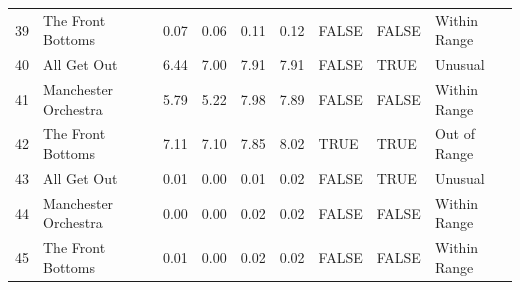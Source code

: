 \documentclass{article}\usepackage[]{graphicx}\usepackage[]{xcolor}
\begin{document}
\begin{table}[H]
\begin{tabular}{rlrrrrlll}
  39 & The Front Bottoms & 0.07 & 0.06 & 0.11 & 0.12 & FALSE & FALSE & Within Range \\ 
  40 & All Get Out & 6.44 & 7.00 & 7.91 & 7.91 & FALSE & TRUE & Unusual \\ 
  41 & Manchester Orchestra & 5.79 & 5.22 & 7.98 & 7.89 & FALSE & FALSE & Within Range \\ 
  42 & The Front Bottoms & 7.11 & 7.10 & 7.85 & 8.02 & TRUE & TRUE & Out of Range \\ 
  43 & All Get Out & 0.01 & 0.00 & 0.01 & 0.02 & FALSE & TRUE & Unusual \\ 
  44 & Manchester Orchestra & 0.00 & 0.00 & 0.02 & 0.02 & FALSE & FALSE & Within Range \\ 
  45 & The Front Bottoms & 0.01 & 0.00 & 0.02 & 0.02 & FALSE & FALSE & Within Range \\ 

   \hline
\end{tabular}
\end{table}

\end{document}
